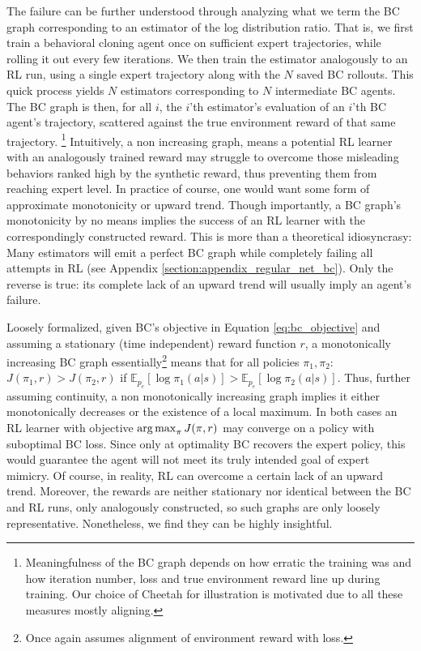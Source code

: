 The failure can be further understood through analyzing what we term the BC graph corresponding to an estimator of the log distribution ratio. That is, we first train a behavioral cloning agent once on sufficient expert trajectories, while rolling it out every few iterations. We then train the estimator analogously to an RL run, using a single expert trajectory along with the $N$ saved BC rollouts. This quick process yields $N$ estimators corresponding to $N$ intermediate BC agents. The BC graph is then, for all $i$, the $i$’th estimator’s evaluation of an $i$’th BC agent's trajectory, scattered against the true environment reward of that same trajectory. \footnote{Meaningfulness of the BC graph depends on how erratic the training was and how iteration number, loss and true environment reward line up during training. Our choice of Cheetah for illustration is motivated due to all these measures mostly aligning.} 
Intuitively, a non increasing graph, means a potential RL learner with an analogously trained reward may struggle to overcome those misleading behaviors ranked high by the synthetic reward, thus preventing them from reaching expert level. In practice of course, one would want some form of approximate monotonicity or upward trend. Though importantly, a BC graph's monotonicity by no means implies the success of an RL learner with the correspondingly constructed reward. This is more than a theoretical idiosyncrasy: Many estimators will emit a perfect BC graph while completely failing all attempts in RL (see Appendix \ref{section:appendix_regular_net_bc}). Only the reverse is true: its complete lack of an upward trend will usually imply an agent's failure. 


Loosely formalized, given BC's objective in Equation \ref{eq:bc_objective} and assuming a stationary (time independent) reward function $r$, a monotonically increasing BC graph essentially\footnote{Once again assumes alignment of environment reward with loss.} means that for all policies $ \pi_1, \pi_2$: $ J(\pi_1,r) > J(\pi_2,r)$ if $ \mathbb{E}_{p_e}[\log \pi_1(a|s)]  > \mathbb{E}_{p_e}[\log \pi_2(a|s)] $. Thus, further assuming continuity, a non monotonically increasing graph implies it either monotonically decreases or the existence of a local maximum. In both cases an RL learner with objective $\operatorname*{arg\,max}_\pi{J(\pi,r)}$ may converge on a policy with suboptimal BC loss. Since only at optimality BC recovers the expert policy, this would guarantee the agent will not meet its truly intended goal of expert mimicry. 
Of course, in reality, RL can overcome a certain lack of an upward trend. Moreover, the rewards are neither stationary nor identical between the BC and RL runs, only analogously constructed, so such graphs are only loosely representative. Nonetheless, we find they can be highly insightful.





